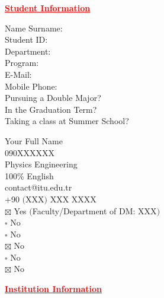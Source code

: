\documentclass[12pt]{article}
\makeatletter
\newcommand{\name}{Your Full Name}
\newcommand{\id}{090XXXXXX}
\newcommand{\mail}{contact@itu.edu.tr}
\makeatother
\begin{document}
{\centering
  \textcolor{red}{\bfseries \ul{ Student Information}}
  \\[1\baselineskip]
  \par}
\begin{minipage}[t]{.3\textwidth}
  \vspace{0pt}
  \begin{flushright}
  Name Surname: \\
  Student ID: \\
  Department: \\
  Program: \\ 
  E-Mail: \\
  Mobile Phone: \\
  Pursuing a Double Major?\\[2\baselineskip]
  In the Graduation Term? \\[1\baselineskip]
  Taking a class at Summer School? \\
  \end{flushright}
\end{minipage}%
\hspace{0.5cm}
\begin{minipage}[t]{.7\textwidth}
  \vspace{0pt}
  \name\\
  \id\\
  Physics Engineering\\
  100\% English\\
  \mail\\
  +90 $($XXX$)$ XXX XXXX \\
  $\boxtimes$ Yes $($Faculty/Department of DM: XXX$)$ \\
  $\square$ No \\[1\baselineskip]
  $\square$ No \\
  $\boxtimes$ No \\[1\baselineskip]
  $\square$ No \\
  $\boxtimes$ No\\
\end{minipage}

\vspace{75pt}

{\centering
  \textcolor{red}{\bfseries \ul{Institution Information}}
  \\[1\baselineskip]
  \par}
\end{document}
